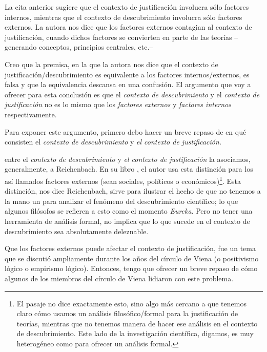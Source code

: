 La cita anterior sugiere que el contexto de justificación involucra sólo factores internos, mientras que el contexto de descubrimiento involucra sólo factores externos.
La autora nos dice que los factores externos contagian al contexto de justificación, cuando dichos factores se convierten en parte de las teorías --generando conceptos, principios centrales, etc.--

Creo que la premisa, en la que la autora nos dice que el contexto de justificación/descubrimiento es equivalente a los factores internos/externos, es falsa y que la equivalencia descansa en una confusión.
El argumento que voy a ofrecer para esta conclusión es que el \emph{contexto de descubrimiento} y el \emph{contexto de justificación} no es lo mismo que los \emph{factores externos} y \emph{factores internos}  respectivamente.

Para exponer este argumento, primero debo hacer un breve repaso de en qué consisten el \emph{contexto de descubrimiento} y \emph{el contexto de justificación.}



 entre el \emph{contexto de descubrimiento} y \emph{el contexto de justificación} la asociamos, generalmente, a Reichenbach.
En su libro , el autor usa esta distinción para  los así llamados factores externos (sean sociales, políticos o económicos)\footnote{
	El pasaje no dice exactamente esto, sino algo más cercano a que tenemos claro cómo usamos un análisis filosófico/formal para la justificación de teorías, mientras que no tenemos manera de hacer ese análisis en el contexto de descubrimiento.
	Este lado de la investigación científica, digamos, es muy heterogéneo como para ofrecer un análisis formal.
}.
Esta distinción, nos dice Reichenbach, sirve para ilustrar el hecho de que no tenemos a la mano un  para analizar el fenómeno del descubrimiento científico; lo que algunos filósofos \parencite{reichenbach1938experience, Seo2015} se refieren a esto como el momento \emph{Eureka}.
Pero no tener una herramienta de análisis formal, no implica que lo que sucede en el contexto de descubrimiento sea absolutamente deleznable.

Que los factores externos puede afectar el contexto de justificación, fue un tema que se discutió ampliamente durante los años del círculo de Viena (o positivismo lógico o empirismo lógico).
Entonces, tengo que ofrecer un breve repaso de cómo algunos de los miembros del círculo de Viena lidiaron con este problema.

